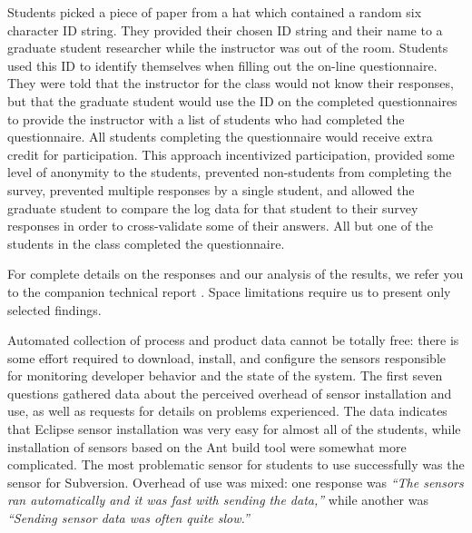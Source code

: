 \documentclass[times,10pt,twocolumn]{article}
\begin{document}
Students picked a piece of paper from a hat which contained a random six
character ID string.  They provided their chosen ID string and their name
to a graduate student researcher while the instructor was out of the room.
Students used this ID to identify themselves when filling out the on-line
questionnaire.  They were told that the instructor for the class would not
know their responses, but that the graduate student would use the ID on the
completed questionnaires to provide the instructor with a list of students
who had completed the questionnaire.  All students completing the
questionnaire would receive extra credit for participation.  This approach
incentivized participation, provided some level of anonymity to the
students, prevented non-students from completing the survey, prevented
multiple responses by a single student, and allowed the graduate student to
compare the log data for that student to their survey responses in order to
cross-validate some of their answers. All but one of the students in the
class completed the questionnaire.

For complete details on the responses and our analysis of the results, we 
refer you to the companion technical report \cite{csdl2-09-03}.  Space limitations 
require us to present only selected findings. 


Automated collection of process and product data cannot be totally free:
there is some effort required to download, install, and configure the
sensors responsible for monitoring developer behavior and the state of the
system.  The first seven questions gathered data about the perceived
overhead of sensor installation and use, as well as requests for details on
problems experienced. The data indicates that Eclipse sensor installation
was very easy for almost all of the students, while installation of sensors
based on the Ant build tool were somewhat more complicated. The most
problematic sensor for students to use successfully was the sensor for
Subversion.  Overhead of use was mixed: one response was {\em ``The sensors ran
automatically and it was fast with sending the data,''} while another was
{\em ``Sending sensor data was often quite slow.''}  

\end{document}
